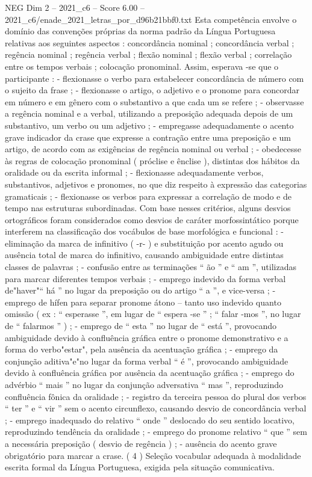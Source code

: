 \begin{textsample}{NEG Dim 2 – 2021\_c6 – Score 6.00 – 2021\_c6/enade\_2021\_letras\_por\_d96b21bbf0.txt}
Esta competência envolve o domínio das convenções próprias da norma padrão da Língua Portuguesa relativas aos seguintes aspectos : concordância nominal ; concordância verbal ; regência nominal ; regência verbal ; flexão nominal ; flexão verbal ; correlação entre os tempos verbais ; colocação pronominal.
Assim, esperava -se que o participante : - flexionasse o verbo para estabelecer concordância de número com o sujeito da frase ; - flexionasse o artigo, o adjetivo e o pronome para concordar em número e em gênero com o substantivo a que cada um se refere ; - observasse a regência nominal e a verbal, utilizando a preposição adequada depois de um substantivo, um verbo ou um adjetivo ; - empregasse adequadamente o acento grave indicador da crase que expresse a contração entre uma preposição e um artigo, de acordo com as exigências de regência nominal ou verbal ; - obedecesse às regras de colocação pronominal ( próclise e ênclise ), distintas dos hábitos da oralidade ou da escrita informal ; - flexionasse adequadamente verbos, substantivos, adjetivos e pronomes, no que diz respeito à expressão das categorias gramaticais ; - flexionasse os verbos para expressar a correlação de modo e de tempo nas estruturas subordinadas.
Com base nesses critérios, alguns desvios ortográficos foram considerados como desvios de caráter morfossintático porque interferem na classificação dos vocábulos de base morfológica e funcional : - eliminação da marca de infinitivo ( -r- ) e substituição por acento agudo ou ausência total de marca do infinitivo, causando ambiguidade entre distintas classes de palavras ; - confusão entre as terminações “ ão ” e “ am ”, utilizadas para marcar diferentes tempos verbais ; - emprego indevido da forma verbal de"haver"“ há ” no lugar da preposição ou do artigo “ a ”, e vice-versa ; - emprego de hífen para separar pronome átono – tanto uso indevido quanto omissão ( ex : “ esperasse ”, em lugar de “ espera -se ” ; “ falar -mos ”, no lugar de “ falarmos ” ) ; - emprego de “ esta ” no lugar de “ está ”, provocando ambiguidade devido à confluência gráfica entre o pronome demonstrativo e a forma do verbo"estar", pela ausência da acentuação gráfica ; - emprego da conjunção aditiva"e"no lugar da forma verbal “ é ”, provocando ambiguidade devido à confluência gráfica por ausência da acentuação gráfica ; - emprego do advérbio “ mais ” no lugar da conjunção adversativa “ mas ”, reproduzindo confluência fônica da oralidade ; - registro da terceira pessoa do plural dos verbos “ ter ” e “ vir ” sem o acento circunflexo, causando desvio de concordância verbal ; - emprego inadequado do relativo “ onde ” deslocado do seu sentido locativo, reproduzindo tendência da oralidade ; - emprego do pronome relativo “ que ” sem a necessária preposição ( desvio de regência ) ; - ausência do acento grave obrigatório para marcar a crase. ( 4 ) Seleção vocabular adequada à modalidade escrita formal da Língua Portuguesa, exigida pela situação comunicativa.

\end{textsample}
